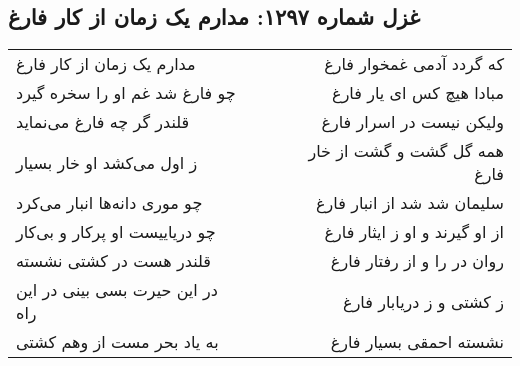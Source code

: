 \begin{center}
\section*{غزل شماره ۱۲۹۷: مدارم یک زمان از کار فارغ}
\label{sec:1297}
\begin{longtable}{l p{0.5cm} r}
مدارم یک زمان از کار فارغ
&&
که گردد آدمی غمخوار فارغ
\\
چو فارغ شد غم او را سخره گیرد
&&
مبادا هیچ کس ای یار فارغ
\\
قلندر گر چه فارغ می‌نماید
&&
ولیکن نیست در اسرار فارغ
\\
ز اول می‌کشد او خار بسیار
&&
همه گل گشت و گشت از خار فارغ
\\
چو موری دانه‌ها انبار می‌کرد
&&
سلیمان شد شد از انبار فارغ
\\
چو دریاییست او پرکار و بی‌کار
&&
از او گیرند و او ز ایثار فارغ
\\
قلندر هست در کشتی نشسته
&&
روان در را و از رفتار فارغ
\\
در این حیرت بسی بینی در این راه
&&
ز کشتی و ز دریابار فارغ
\\
به یاد بحر مست از وهم کشتی
&&
نشسته احمقی بسیار فارغ
\\
\end{longtable}
\end{center}
